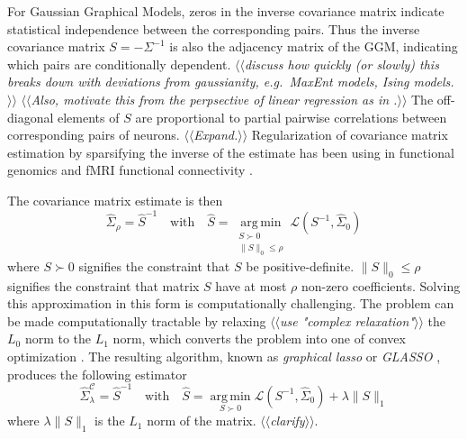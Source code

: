 \documentclass[10pt]{article}
\newcommand{\Kcomment}[1]{{\color{blue}{[KJ: #1]}}}
\newcommand{\loss}[1]{\mathcal L\left(#1\right)}
\newcommand{\TODO}[1]{\emph{\small\color{blue}$\langle\langle$#1$\rangle\rangle$}}
\DeclareMathOperator*{\argmin}{arg\,min}
\begin{document}
For Gaussian Graphical Models, zeros in the inverse covariance matrix indicate statistical independence between the corresponding pairs. Thus the inverse covariance matrix $S=-\Sigma^{-1}$ is also the adjacency matrix of the GGM, indicating which pairs are conditionally dependent. \TODO{discuss how quickly (or slowly) this breaks down with deviations from gaussianity, e.g.~MaxEnt models, Ising models.} \TODO{Also, motivate this from the perpsective of linear regression as in \cite{Varoquaux:2012}.}  \Kcomment{This is a bit confusing -- in the first sentence, you have statistical independence, in the second, you talk about conditional independence.  You want to emphasize that a 0 inverse means that -- in the GGM -- the two nodes only ``talk'' indirectly through other nodes.} The off-diagonal elements of $S$ are proportional to partial pairwise correlations between corresponding pairs of neurons. \TODO{Expand.} Regularization of covariance matrix estimation by sparsifying the inverse of the estimate has been using in functional genomics \cite{Schafer:2005,Peng:2009} and fMRI functional connectivity \cite{Varoquaux:2012,Ryali:2012}. 

The covariance matrix estimate is then 
\begin{equation}
\hat\Sigma_\rho = \hat S^{-1}
\quad\mbox{with}\quad
\hat S = \argmin\limits_{\substack{S\succ 0 \\ \|S\|_0 \le \rho}} \loss{S^{-1},\hat\Sigma_0}   
\end{equation}
where $S\succ 0$ signifies the constraint that $S$ be positive-definite. $\|S\|_0\le\rho$ signifies the constraint  that matrix $S$ have at most $\rho$ non-zero coefficients.
Solving this approximation in this form is computationally challenging. The problem can be made computationally tractable by relaxing \TODO{use "complex relaxation"} the $L_0$ norm to the $L_1$ norm, which converts the problem into one of convex optimization \cite{Donoho:2000}.  The resulting algorithm, known as \emph{graphical lasso} or \emph{GLASSO}  \cite{Meinshausen:2006,Yuan:2007,Banerjee:2008,Friedman:2008}, produces the following estimator  
\begin{equation}
\hat\Sigma_\lambda^\mathcal{C} = \hat S^{-1}
\quad\mbox{with}\quad
\hat S = \argmin\limits_{S\succ 0} \loss{S^{-1},\hat\Sigma_0} + \lambda \|S\|_1
\end{equation}
where $\lambda \|S\|_1$ is the $L_1$ norm of the matrix. \TODO{clarify}. \Kcomment{Yes - at least define the norm, if you are already taking about it. No need to expand a lot more, though.}
\end{document}
